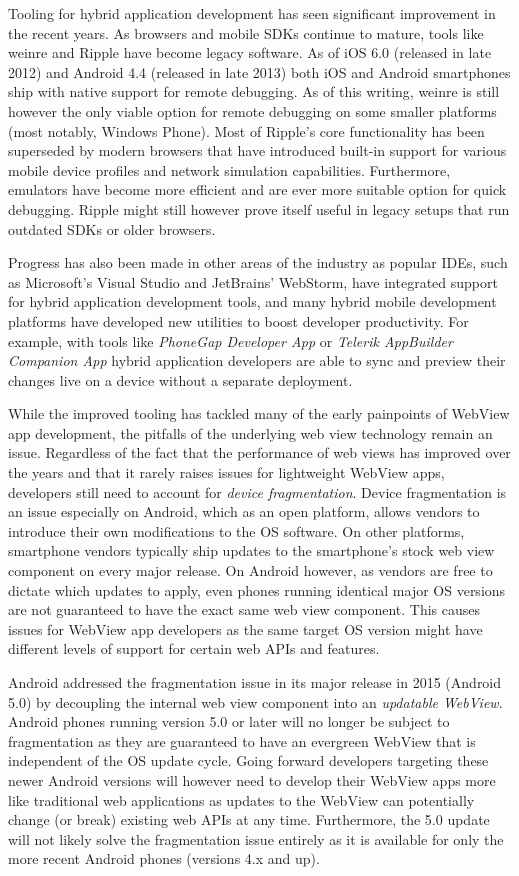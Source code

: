 \documentclass[thesis.tex]{subfiles}
\begin{document}
Tooling for hybrid application development has seen significant improvement in the recent years. As browsers and mobile SDKs continue to mature, tools like weinre and Ripple have become legacy software. As of iOS 6.0 (released in late 2012) and Android 4.4 (released in late 2013) both iOS and Android smartphones ship with native support for remote debugging. As of this writing, weinre is still however the only viable option for remote debugging on some smaller platforms (most notably, Windows Phone). Most of Ripple's core functionality has been superseded by modern browsers that have introduced built-in support for various mobile device profiles and network simulation capabilities. Furthermore, emulators have become more efficient and are ever more suitable option for quick debugging. Ripple might still however prove itself useful in legacy setups that run outdated SDKs or older browsers.

Progress has also been made in other areas of the industry as popular IDEs, such as Microsoft's Visual Studio and JetBrains' WebStorm, have integrated support for hybrid application development tools, and many hybrid mobile development platforms have developed new utilities to boost developer productivity. For example, with tools like \textit{PhoneGap Developer App} or \textit{Telerik AppBuilder Companion App} hybrid application developers are able to sync and preview their changes live on a device without a separate deployment.

While the improved tooling has tackled many of the early painpoints of WebView app development, the pitfalls of the underlying web view technology remain an issue. Regardless of the fact that the performance of web views has improved over the years and that it rarely raises issues for lightweight WebView apps, developers still need to account for \textit{device fragmentation}. Device fragmentation is an issue especially on Android, which as an open platform, allows vendors to introduce their own modifications to the OS software. On other platforms, smartphone vendors typically ship updates to the smartphone's stock web view component on every major release. On Android however, as vendors are free to dictate which updates to apply, even phones running identical major OS versions are not guaranteed to have the exact same web view component. This causes issues for WebView app developers as the same target OS version might have different levels of support for certain web APIs and features.

Android addressed the fragmentation issue in its major release in 2015 (Android 5.0) by decoupling the internal web view component into an \textit{updatable WebView}. Android phones running version 5.0 or later will no longer be subject to fragmentation as they are guaranteed to have an evergreen WebView that is independent of the OS update cycle. Going forward developers targeting these newer Android versions will however need to develop their WebView apps more like traditional web applications as updates to the WebView can potentially change (or break) existing web APIs at any time. Furthermore, the 5.0 update will not likely solve the fragmentation issue entirely as it is available for only the more recent Android phones (versions 4.x and up).
\end{document}
